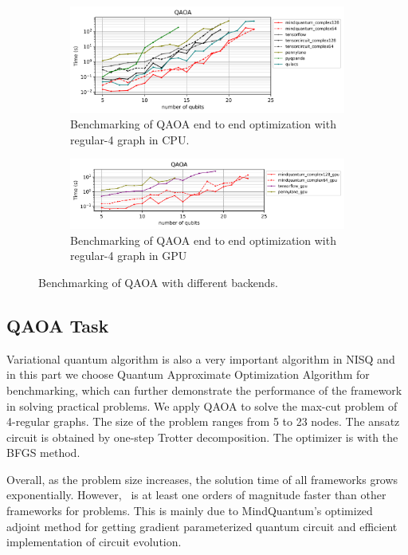 \begin{figure}
    \centering
    \begin{subfigure}{0.9\textwidth}
        \centering
        \includegraphics[width=\textwidth]{images/7_QAOA_CPU.png}
        \caption{Benchmarking of QAOA end to end optimization with regular-4 graph in CPU.}
        \label{7_regular_4_cpu}
    \end{subfigure}
    \begin{subfigure}{0.9\textwidth}
        \centering
        \includegraphics[width=\textwidth]{images/7_QAOA_GPU.png}
        \caption{Benchmarking of QAOA end to end optimization with regular-4 graph in GPU}
        \label{7_regular_4_gpu}
    \end{subfigure}
    \caption{Benchmarking of QAOA with different backends.}
\end{figure}

\subsection{QAOA Task}

Variational quantum algorithm is also a very important algorithm in NISQ and in this part we choose Quantum Approximate Optimization Algorithm for benchmarking, which can further demonstrate the performance of the framework in solving practical problems. We apply QAOA to solve the max-cut problem of 4-regular graphs. The size of the problem ranges from 5 to 23 nodes. The ansatz circuit is obtained by one-step Trotter decomposition. The optimizer is  with the BFGS method.

Overall, as the problem size increases, the solution time of all frameworks grows exponentially. However, \MindQuantum\ is at least one orders of magnitude faster than other frameworks for problems. This is mainly due to MindQuantum's optimized adjoint method for getting gradient parameterized quantum circuit and efficient implementation of circuit evolution.
